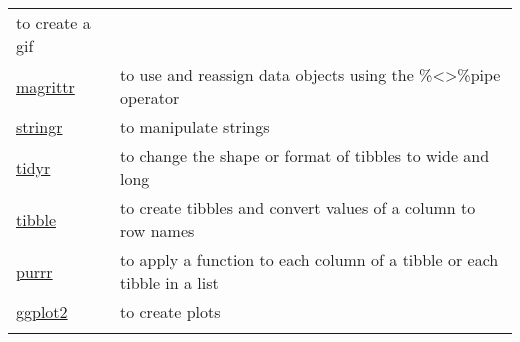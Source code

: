 \documentclass[
]{article}
\begin{document}
\begin{longtable}[]{@{}ll@{}}
\begin{minipage}[t]{0.53\columnwidth}
to create a gif\strut
\end{minipage}\tabularnewline
\begin{minipage}[t]{0.41\columnwidth}\raggedright
\href{https://magrittr.tidyverse.org/}{magrittr}\strut
\end{minipage} & \begin{minipage}[t]{0.53\columnwidth}\raggedright
to use and reassign data objects using the \%\textless\textgreater\%pipe
operator\strut
\end{minipage}\tabularnewline
\begin{minipage}[t]{0.41\columnwidth}\raggedright
\href{https://stringr.tidyverse.org/}{stringr}\strut
\end{minipage} & \begin{minipage}[t]{0.53\columnwidth}\raggedright
to manipulate strings\strut
\end{minipage}\tabularnewline
\begin{minipage}[t]{0.41\columnwidth}\raggedright
\href{https://tidyr.tidyverse.org/}{tidyr}\strut
\end{minipage} & \begin{minipage}[t]{0.53\columnwidth}\raggedright
to change the shape or format of tibbles to wide and long\strut
\end{minipage}\tabularnewline
\begin{minipage}[t]{0.41\columnwidth}\raggedright
\href{https://tibble.tidyverse.org/}{tibble}\strut
\end{minipage} & \begin{minipage}[t]{0.53\columnwidth}\raggedright
to create tibbles and convert values of a column to row names\strut
\end{minipage}\tabularnewline
\begin{minipage}[t]{0.41\columnwidth}\raggedright
\href{https://purrr.tidyverse.org/}{purrr}\strut
\end{minipage} & \begin{minipage}[t]{0.53\columnwidth}\raggedright
to apply a function to each column of a tibble or each tibble in a
list\strut
\end{minipage}\tabularnewline
\begin{minipage}[t]{0.41\columnwidth}\raggedright
\href{https://ggplot2.tidyverse.org/}{ggplot2}\strut
\end{minipage} & \begin{minipage}[t]{0.53\columnwidth}\raggedright
to create plots\strut
\end{minipage}\tabularnewline
\begin{minipage}[t]{0.41\columnwidth}\raggedright

\end{minipage}
\end{longtable}
\end{document}
